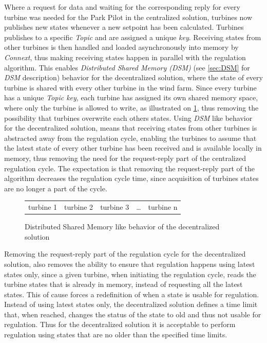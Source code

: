 Where a request for data and waiting for the corresponding reply for every turbine was needed for the Park Pilot in the centralized solution, turbines now publishes new states whenever a new setpoint has been calculated. Turbines publishes to a specific \textit{Topic} and are assigned a unique \textit{key}. Receiving states from other turbines is then handled and loaded asynchronously into memory by \textit{Connext}, thus making receiving states happen in parallel with the regulation algorithm. This enables \textit{Distributed Shared Memory (DSM)} (see \cref{sec:DSM} for \textit{DSM} description) behavior for the decentralized solution, where the state of every turbine is shared with every other turbine in the wind farm. Since every turbine has a unique \textit{Topic key}, each turbine has assigned its own shared memory space, where only the turbine is allowed to write, as illustrated on \cref{fig:DSMlikeBehavior}, thus removing the possibility that turbines overwrite each others states. Using \textit{DSM} like behavior for the decentralized solution, means that receiving states from other turbines is abstracted away from the regulation cycle, enabling the turbines to assume that the latest state of every other turbine has been received and is available locally in memory, thus removing the need for the request-reply part of the centralized regulation cycle. The expectation is that removing the request-reply part of the algorithm decreases the regulation cycle time, since acquisition of turbines states are no longer a part of the cycle.  

\begin{figure}
	\begin{tabular}{ | c | c | c | c | c |}
		\cline{1-3}
		\cline{5-5}
		turbine 1 & turbine 2 & turbine 3 & \dots & turbine n \\
		\cline{1-3}
		\cline{5-5}
	\end{tabular}
	\caption{Distributed Shared Memory like behavior of the decentralized solution}
	\label{fig:DSMlikeBehavior}
\end{figure}

Removing the request-reply part of the regulation cycle for the decentralized solution, also removes the ability to ensure that regulation happens using latest states only, since a given turbine, when initiating the regulation cycle, reads the turbine states that is already in memory, instead of requesting all the latest states. This of cause forces a redefinition of when a state is usable for regulation. Instead of using latest states only, the decentralized solution defines a time limit that, when reached, changes the status of the state to old and thus not usable for regulation. Thus for the decentralized solution it is acceptable to perform regulation using states that are no older than the specified time limits. 

